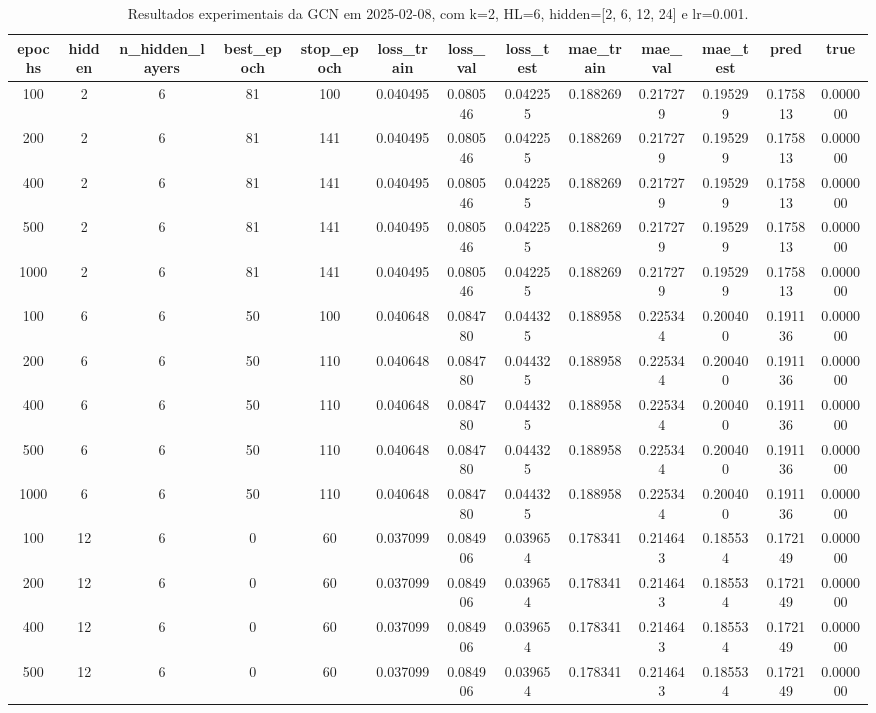 \begin{table}[h]
\centering
\caption{Resultados experimentais da GCN em 2025-02-08, com k=2, HL=6, hidden=[2, 6, 12, 24] e lr=0.001.}
\label{tab:gcn_results_k2_hl6_d20250208}
\begin{tabular}{ccccccccccccc}
\toprule
epochs & hidden & n\_hidden\_layers & best\_epoch & stop\_epoch & loss\_train & loss\_val & loss\_test & mae\_train & mae\_val & mae\_test & pred & true \\
\midrule
100 & 2 & 6 & 81 & 100 & 0.040495 & 0.080546 & 0.042255 & 0.188269 & 0.217279 & 0.195299 & 0.175813 & 0.000000 \\
200 & 2 & 6 & 81 & 141 & 0.040495 & 0.080546 & 0.042255 & 0.188269 & 0.217279 & 0.195299 & 0.175813 & 0.000000 \\
400 & 2 & 6 & 81 & 141 & 0.040495 & 0.080546 & 0.042255 & 0.188269 & 0.217279 & 0.195299 & 0.175813 & 0.000000 \\
500 & 2 & 6 & 81 & 141 & 0.040495 & 0.080546 & 0.042255 & 0.188269 & 0.217279 & 0.195299 & 0.175813 & 0.000000 \\
1000 & 2 & 6 & 81 & 141 & 0.040495 & 0.080546 & 0.042255 & 0.188269 & 0.217279 & 0.195299 & 0.175813 & 0.000000 \\
100 & 6 & 6 & 50 & 100 & 0.040648 & 0.084780 & 0.044325 & 0.188958 & 0.225344 & 0.200400 & 0.191136 & 0.000000 \\
200 & 6 & 6 & 50 & 110 & 0.040648 & 0.084780 & 0.044325 & 0.188958 & 0.225344 & 0.200400 & 0.191136 & 0.000000 \\
400 & 6 & 6 & 50 & 110 & 0.040648 & 0.084780 & 0.044325 & 0.188958 & 0.225344 & 0.200400 & 0.191136 & 0.000000 \\
500 & 6 & 6 & 50 & 110 & 0.040648 & 0.084780 & 0.044325 & 0.188958 & 0.225344 & 0.200400 & 0.191136 & 0.000000 \\
1000 & 6 & 6 & 50 & 110 & 0.040648 & 0.084780 & 0.044325 & 0.188958 & 0.225344 & 0.200400 & 0.191136 & 0.000000 \\
100 & 12 & 6 & 0 & 60 & 0.037099 & 0.084906 & 0.039654 & 0.178341 & 0.214643 & 0.185534 & 0.172149 & 0.000000 \\
200 & 12 & 6 & 0 & 60 & 0.037099 & 0.084906 & 0.039654 & 0.178341 & 0.214643 & 0.185534 & 0.172149 & 0.000000 \\
400 & 12 & 6 & 0 & 60 & 0.037099 & 0.084906 & 0.039654 & 0.178341 & 0.214643 & 0.185534 & 0.172149 & 0.000000 \\
500 & 12 & 6 & 0 & 60 & 0.037099 & 0.084906 & 0.039654 & 0.178341 & 0.214643 & 0.185534 & 0.172149 & 0.000000 \\

\end{tabular}
\end{table}
